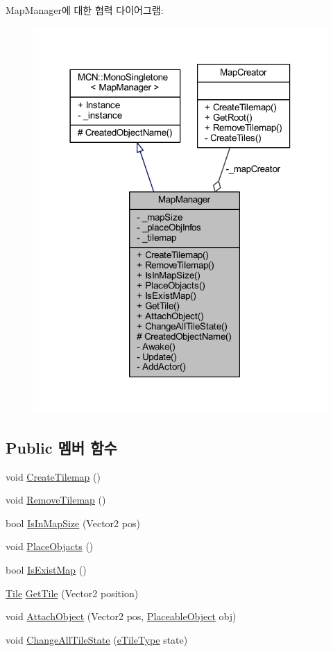 Map\+Manager에 대한 협력 다이어그램\+:\nopagebreak
\begin{figure}[H]
\begin{center}
\leavevmode
\includegraphics[width=318pt]{class_map_manager__coll__graph}
\end{center}
\end{figure}
\subsection*{Public 멤버 함수}
\begin{DoxyCompactItemize}
\item 
void \hyperlink{class_map_manager_aa6125f2ca4b3c4e8858f73f5e65d385b}{Create\+Tilemap} ()
\item 
void \hyperlink{class_map_manager_aac20afabde4946e32ce1e719c72e0f50}{Remove\+Tilemap} ()
\item 
bool \hyperlink{class_map_manager_a504d7a68ace64557bc3c3254a8b1cddc}{Is\+In\+Map\+Size} (Vector2 pos)
\item 
void \hyperlink{class_map_manager_a4213ccbaa1a81d0a47884de50a28de32}{Place\+Objacts} ()
\item 
bool \hyperlink{class_map_manager_a9a18efae73b0d690d2bc6c8ac8703a02}{Is\+Exist\+Map} ()
\item 
\hyperlink{class_tile}{Tile} \hyperlink{class_map_manager_ae457099efdd1a804add3b851b2bc7691}{Get\+Tile} (Vector2 position)
\item 
void \hyperlink{class_map_manager_ab8cbf46e369a9c59ff183a1b6c3b20bb}{Attach\+Object} (Vector2 pos, \hyperlink{class_placeable_object}{Placeable\+Object} obj)
\item 
void \hyperlink{class_map_manager_a68f796431393b7239320ab1f5200213a}{Change\+All\+Tile\+State} (\hyperlink{_tile_8cs_a271bc07be325bca511bcb747e0ff2fda}{e\+Tile\+Type} state)
\end{DoxyCompactItemize}
